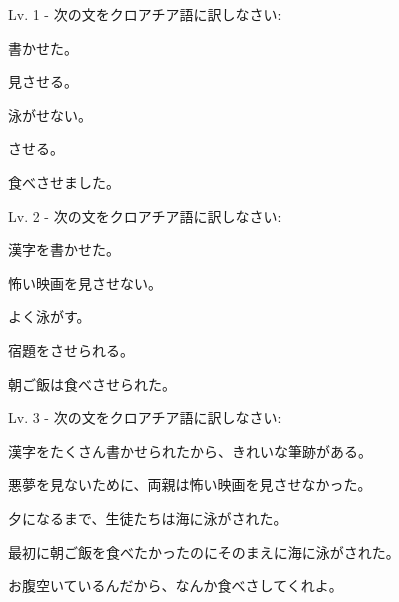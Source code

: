 	\begin{reibun}
	\end{reibun}

	\newpage		
		
	\begin{mondai}{Lv. 1 - 次の文をクロアチア語に訳しなさい: }
		\item 書かせた。
		\item 見させる。
		\item 泳がせない。
		\item させる。
		\item 食べさせました。
	\end{mondai}
		
	\begin{mondai}{Lv. 2 - 次の文をクロアチア語に訳しなさい: }
		\item 漢字を書かせた。
		\item 怖い映画を見させない。
		\item よく泳がす。
		\item 宿題をさせられる。
		\item 朝ご飯は食べさせられた。
	\end{mondai}
	
	\begin{mondai}{Lv. 3 - 次の文をクロアチア語に訳しなさい: }
		\item 漢字をたくさん書かせられたから、きれいな筆跡がある。
		\item 悪夢を見ないために、両親は怖い映画を見させなかった。
		\item 夕になるまで、生徒たちは海に泳がされた。
		\item 最初に朝ご飯を食べたかったのにそのまえに海に泳がされた。
		\item お腹空いているんだから、なんか食べさしてくれよ。\footnotemark[1]
	\end{mondai}

